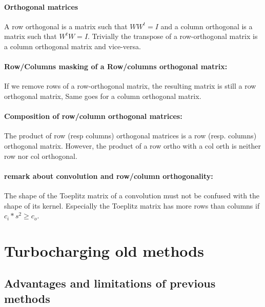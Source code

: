    \paragraph{Orthogonal matrices}

        A row orthogonal is a matrix such that $ WW^t = I $ and a column orthogonal is a matrix such that $ W^tW = I $. Trivially the transpose of a row-orthogonal matrix is a column orthogonal matrix and vice-versa.
        
        \paragraph{Row/Columns masking of a Row/columns orthogonal matrix:} If we remove rows of a row-orthogonal matrix, the resulting matrix is still a row orthogonal matrix, Same goes for a column orthogonal matrix.

        \paragraph{Composition of row/column orthogonal matrices:} The product of row (resp columns) orthogonal matrices is a row (resp. columns) orthogonal matrix. However, the product of a row ortho with a col orth is neither row nor col orthogonal.

        \paragraph{remark about convolution and row/column orthogonality:} The shape of the Toeplitz matrix of a convolution must not be confused with the shape of its kernel. Especially the Toeplitz matrix has more rows than columns if $ c_i * s^2 \geq c_o $. %


\section{Turbocharging old methods}

    \subsection{Advantages and limitations of previous methods}

